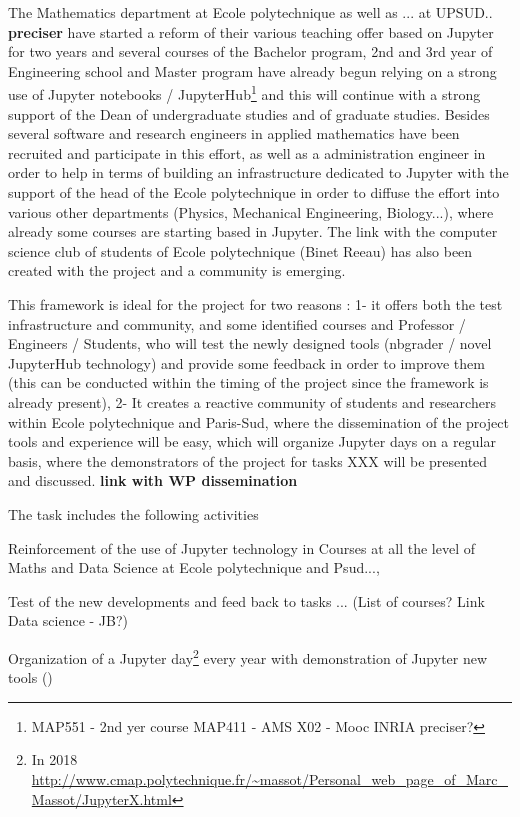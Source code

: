 \begin{task}[
  title=Teaching with Jupyter technology,
  id=teaching,
  lead=EP,
  PM=8, %
  wphases={0-48},
  partners={EP,UPSUD}
  ]

  The Mathematics department at Ecole polytechnique as well as ... at UPSUD..
  {\bf preciser} have started a reform of their various teaching offer based on
  Jupyter for two years and several courses of the Bachelor program, 2nd and 3rd
  year of Engineering school and Master program have already begun relying on a
  strong use of Jupyter notebooks / JupyterHub\footnote{MAP551 - 2nd yer course
  MAP411 - AMS X02 - Mooc INRIA preciser?} and this will continue with a strong
  support of the Dean of undergraduate studies and of graduate studies. Besides
  several software and research engineers in applied mathematics have been
  recruited and participate in this effort, as well as a administration engineer
  in order to help in terms of building an infrastructure dedicated to Jupyter
  with the support of the head of the Ecole polytechnique in order to diffuse
  the effort into various other departments (Physics, Mechanical Engineering,
  Biology...), where already some courses are starting based in Jupyter. The
  link with the computer science club of students of Ecole polytechnique (Binet
  Reeau) has also been created with the project and a community is emerging.

  This framework is ideal for the project for two reasons : 1- it offers both
  the test infrastructure and community, and some identified courses and
  Professor / Engineers / Students, who will test the newly designed tools
  (nbgrader / novel JupyterHub technology) and provide some feedback in order to
  improve them (this can be conducted within the timing of the project since the
  framework is already present), 2- It creates a reactive community of students
  and researchers within Ecole polytechnique and Paris-Sud, where the
  dissemination of the project tools and experience will be easy, which will
  organize Jupyter days on a regular basis, where the demonstrators of the
  project for tasks XXX will be presented and discussed. {\bf link with WP
  dissemination}

  The task includes the following activities
  \begin{compactitem}
  \item Reinforcement of the use of Jupyter technology in Courses at all the level of Maths and Data Science at Ecole polytechnique and Psud...,
  \item Test of the new developments and feed back to tasks ... (List of courses? Link Data science - JB?)
  \item Organization of a Jupyter day\footnote{In 2018 \url{http://www.cmap.polytechnique.fr/~massot/Personal_web_page_of_Marc_Massot/JupyterX.html}} every year with demonstration of Jupyter new tools
    ()
  \end{compactitem}
\end{task}
